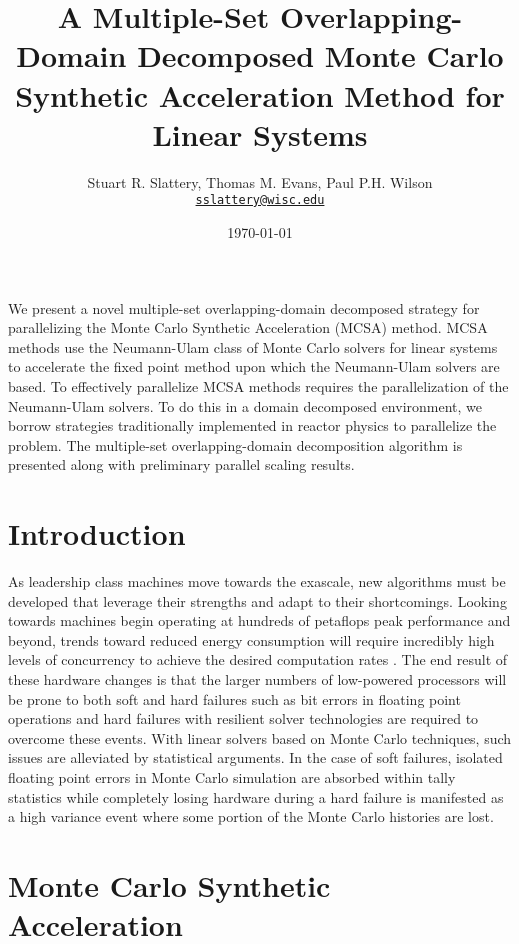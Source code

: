 \documentclass[letterpaper,10pt]{article}
\author{Stuart R. Slattery, Thomas M. Evans, Paul P.H. Wilson
\\ \href{mailto:sslattery@wisc.edu}{\texttt{sslattery@wisc.edu}}
}
\date{\today}
\title{A Multiple-Set Overlapping-Domain Decomposed Monte Carlo
  Synthetic Acceleration Method for Linear Systems}
\begin{document}
\maketitle

\abstract
We present a novel multiple-set overlapping-domain decomposed strategy
for parallelizing the Monte Carlo Synthetic Acceleration (MCSA)
method. MCSA methods use the Neumann-Ulam class of Monte Carlo solvers
for linear systems to accelerate the fixed point method upon which
the Neumann-Ulam solvers are based. To effectively parallelize MCSA
methods requires the parallelization of the Neumann-Ulam solvers. To
do this in a domain decomposed environment, we borrow strategies
traditionally implemented in reactor physics to parallelize the
problem. The multiple-set overlapping-domain decomposition algorithm
is presented along with preliminary parallel scaling results.

\section{Introduction}
As leadership class machines move towards the exascale, new algorithms
must be developed that leverage their strengths and adapt to their
shortcomings. Looking towards machines begin operating at hundreds of
petaflops peak performance and beyond, trends toward reduced energy
consumption will require incredibly high levels of concurrency to
achieve the desired computation rates \cite{kogge_using_2011}. The end
result of these hardware changes is that the larger numbers of
low-powered processors will be prone to both soft and hard failures
such as bit errors in floating point operations and hard failures with
resilient solver technologies are required to overcome these
events. With linear solvers based on Monte Carlo techniques, such
issues are alleviated by statistical arguments. In the case of soft
failures, isolated floating point errors in Monte Carlo simulation are
absorbed within tally statistics while completely losing hardware
during a hard failure is manifested as a high variance event where
some portion of the Monte Carlo histories are lost.

\section{Monte Carlo Synthetic Acceleration}
\end{document}
